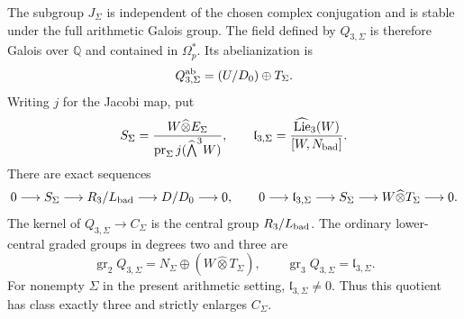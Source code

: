 \begin{proposition}
\label{prop:selected-class-three}
The subgroup $J_\Sigma$ is independent of the chosen complex
conjugation and is stable under the full arithmetic Galois group.
The field defined by $Q_{3,\Sigma}$ is therefore Galois over
$\mathbb Q$ and contained in $\Omega_p^*$.  Its abelianization is
\[
 Q_{3,\Sigma}^{\rm ab}=(U/D_0)\oplus T_\Sigma.
\]
Writing $j$ for the Jacobi map, put
\[
 S_\Sigma=
 \frac{W\widehat\otimes E_\Sigma}
 {\operatorname{pr}_\Sigma j(\widehat\bigwedge^3W)},
 \qquad
 \mathfrak l_{3,\Sigma}=
 \frac{\widehat{\operatorname{Lie}}_3(W)}{[W,N_{\rm bad}]}.
\]
There are exact sequences
\[
 0\longrightarrow S_\Sigma\longrightarrow
 R_3/L_{\rm bad}\longrightarrow D/D_0\longrightarrow0,
 \qquad
 0\longrightarrow \mathfrak l_{3,\Sigma}\longrightarrow S_\Sigma
 \longrightarrow W\widehat\otimes T_\Sigma\longrightarrow0.
\]
The kernel of $Q_{3,\Sigma}\to C_\Sigma$ is the central
group $R_3/L_{\rm bad}$.  The ordinary lower-central graded
groups in degrees two and three are
\[
 \operatorname{gr}_2Q_{3,\Sigma}
   =N_\Sigma\oplus(W\widehat\otimes T_\Sigma),
 \qquad
 \operatorname{gr}_3Q_{3,\Sigma}=\mathfrak l_{3,\Sigma}.
\]
For nonempty $\Sigma$ in the present arithmetic setting,
$\mathfrak l_{3,\Sigma}\ne0$.  Thus this quotient has class exactly three
and strictly enlarges $C_\Sigma$.
\end{proposition}

